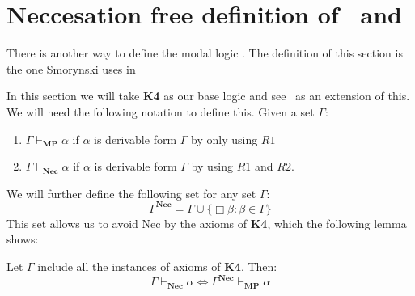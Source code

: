 \documentclass[../main.tex]{subfiles}
\begin{document}
\chapter{Neccesation free definition of \GL\ and \GLS}

There is another way to define the modal logic \GLS. The definition of this
section is the one Smorynski uses in \cite{Smor1985}

In this section we will take \textbf{K4} as our base logic and see \GL\  as an
extension of this.
We will need the following notation to
define this. Given a set $\Gamma$:
\begin{enumerate}
	\item $\Gamma\vdash_{\textbf{MP}}\alpha$ if $\alpha$ is derivable form $\Gamma$ by
		only using $R1$
	\item $\Gamma\vdash_{\textbf{Nec}}\alpha$ if $\alpha$ is derivable form $\Gamma$ by
		using $R1$ and $R2$.
\end{enumerate}
We will further define the following set for any set $\Gamma$:
\[
	\Gamma^{\textbf{Nec}}=\Gamma\cup\{\Box\beta:\beta\in\Gamma\}
\]
This set allows us to avoid Nec by the axioms of \textbf{K4}, which the
following lemma shows:
\begin{lem}
	Let $\Gamma$ include all the instances  of axioms of \textbf{K4}. Then:
	\[
		\Gamma\vdash_{\textbf{Nec}}\alpha\Leftrightarrow\Gamma^{\textbf{Nec}}\vdash_{\textbf{MP}}\alpha
	\]
\end{lem}
\end{document}
